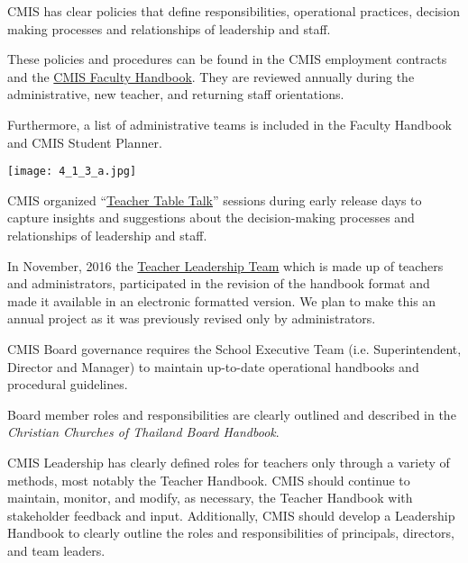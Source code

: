 \begin{findings}
CMIS has clear policies that define responsibilities, operational practices, decision making processes and relationships of leadership and staff. 

These policies and procedures can be found in the CMIS employment contracts and the \href{https://drive.google.com/a/cmis.ac.th/file/d/0ByVFfrm0zfolVm9uc19UNl82NVpPMUZ1ZEstZlFidEY1c2hn/view?usp=sharing}{CMIS Faculty Handbook}. They are reviewed annually during the administrative, new teacher, and returning staff orientations. 

Furthermore, a list of administrative teams is included in the Faculty Handbook and CMIS Student Planner. 

{\centering\texttt{[image: 4\_1\_3\_a.jpg]}}

CMIS organized ``\href{https://drive.google.com/a/cmis.ac.th/file/d/0ByVFfrm0zfolbHNvSWhVWmJYU3M/view?usp=sharing}{Teacher Table Talk}'' sessions during early release days to capture insights and suggestions about the decision-making processes and relationships of leadership and staff. 

In November, 2016 the \href{https://docs.google.com/a/cmis.ac.th/document/d/1iW_tWIwRlWU2p0oIOvd3usDsxj9qYDt_2ROwNPBTHSc/edit?usp=sharing}{Teacher Leadership Team}  which is made up of teachers and administrators, participated in the revision of the handbook format and made it available in an electronic formatted version. We plan to make this an annual project as it was previously revised only by administrators.

CMIS Board governance requires the School Executive Team (i.e. Superintendent, Director and Manager) to maintain up-to-date operational handbooks and procedural guidelines.

Board member roles and responsibilities are clearly outlined and described in the \textit{Christian Churches of Thailand Board Handbook}.


CMIS Leadership has clearly defined roles for teachers only through a variety of methods, most notably the Teacher Handbook. CMIS should continue to maintain, monitor, and modify, as necessary, the Teacher Handbook with stakeholder feedback and input. Additionally, CMIS should develop a Leadership Handbook to clearly outline the roles and responsibilities of principals, directors, and team leaders.
\end{findings}

